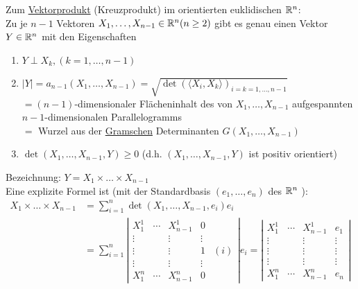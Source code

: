 Zum \uline{Vektorprodukt} (Kreuzprodukt) im orientierten euklidischen \(\mathbb{R}^n\): \\
  Zu je \(n-1\) Vektoren \(X_1, \dots, X_{n-1} \in \mathbb{R}^n (n\ge 2)\) gibt es genau einen Vektor \(Y\in \mathbb{R}^n\) mit den Eigenschaften
  \begin{enumerate}
   \item \(Y \perp X_k, (k = 1, \dots, n-1) \)
   \item \(|Y|=a_{n-1}(X_1, \dots, X_{n-1}) = \sqrt{\det\left(\langle X_i, X_k \rangle\right)_{i=k=1,\dots,n-1}} \) \\
	  \(= (n-1)\)-dimensionaler Flächeninhalt des von \(X_1, \dots, X_{n-1}\) aufgespannten \(n-1\)-dimensionalen Parallelogramms \\
	  \(=\) Wurzel aus der \uline{Gramschen} Determinanten \(G(X_1,\dots, X_{n-1})\)
   \item \(\det (X_1, \dots, X_{n-1}, Y) \ge 0\) (d.h. \((X_1, \dots, X_{n-1}, Y)\) ist positiv orientiert)
  \end{enumerate}
Bezeichnung: \(Y=X_1 \times \dots \times X_{n-1}\) \\
Eine explizite Formel ist (mit der Standardbasis \((e_1, \dots , e_n)\) des \(\mathbb{R}^n\) ): 
\begin{align*}
 X_1 \times \dots \times X_{n-1} &= \sum_{i=1}^n \det (X_1, \dots, X_{n-1},e_i)e_i \\
				 &= \sum_{i=1}^n \left\vert\begin{matrix}
                                                            X_1^1  &\cdots  &X_{n-1}^1 &0 &\\
                                                            \vdots &       & \vdots   &\vdots &\\
                                                            \vdots &       & \vdots   &1 &(i)\\
                                                            \vdots &       & \vdots   & \vdots &\\
                                                            X_1^n  & \cdots &X_{n-1}^n &0 &
                                                           \end{matrix}
                                                           \right\vert  e_i = \left\vert\begin{matrix}
										         X_1^1 & \cdots & X_{n-1}^1 & e_1 \\
                                                                                         \vdots & & \vdots & \vdots \\
                                                                                         \vdots & & \vdots & \vdots \\
                                                                                         \vdots & & \vdots & \vdots \\
                                                                                         X_1^n & \cdots & X_{n-1}^n & e_n
                                                                                        \end{matrix}
                                                                                        \right\vert
\end{align*}
